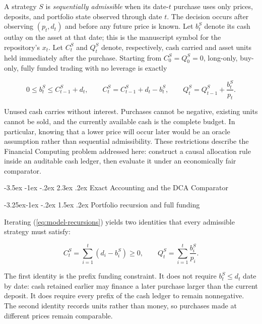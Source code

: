 \documentclass[12pt,a4paper,oneside]{report}
\makeatletter
\renewcommand\section{\@startsection{section}{1}{\z@}%
  {-3.5ex \@plus -1ex \@minus -.2ex}%
  {2.3ex \@plus .2ex}%
  {\normalfont\fontsize{14}{17}\selectfont\bfseries}}
\renewcommand\subsection{\@startsection{subsection}{2}{\z@}%
  {-3.25ex\@plus -1ex \@minus -.2ex}%
  {1.5ex \@plus .2ex}%
  {\normalfont\fontsize{12}{15}\selectfont\bfseries}}
\makeatother
\begin{document}
A strategy $S$ is \emph{sequentially admissible} when its date-$t$ purchase
uses only prices, deposits, and portfolio state observed through date $t$.
The decision occurs after observing $(p_t,d_t)$ and before any future price is
known. Let $b_t^S$ denote its cash outlay on the asset at that date; this is
the manuscript symbol for the repository's $x_t$. Let $C_t^S$ and $Q_t^S$
denote, respectively, cash carried and asset units held immediately after the
purchase. Starting from $C_0^S=Q_0^S=0$, long-only, buy-only, fully funded
trading with no leverage is exactly

\begin{equation}
  0\leq b_t^S\leq C_{t-1}^S+d_t,\qquad
  C_t^S=C_{t-1}^S+d_t-b_t^S,\qquad
  Q_t^S=Q_{t-1}^S+\frac{b_t^S}{p_t}.
  \label{eq:model-recursions}
\end{equation}

Unused cash carries without interest. Purchases cannot be negative, existing
units cannot be sold, and the currently available cash is the complete budget.
In particular, knowing that a lower price will occur later would be an oracle
assumption rather than sequential admissibility. These restrictions describe
the Financial Computing problem addressed here: construct a causal allocation
rule inside an auditable cash ledger, then evaluate it under an economically
fair comparator.

\section{Exact Accounting and the DCA Comparator}

\subsection{Portfolio recursion and full funding}
\label{sec:portfolio-recursion}

Iterating (\ref{eq:model-recursions}) yields two identities that every
admissible strategy must satisfy:

\begin{equation}
  C_t^S=\sum_{i=1}^{t}(d_i-b_i^S)\geq0,
  \qquad
  Q_t^S=\sum_{i=1}^{t}\frac{b_i^S}{p_i}.
  \label{eq:model-ledger}
\end{equation}

The first identity is the prefix funding constraint. It does not require
$b_t^S\leq d_t$ date by date: cash retained earlier may finance a later
purchase larger than the current deposit. It does require every prefix of the
cash ledger to remain nonnegative. The second identity records units rather
than money, so purchases made at different prices remain comparable.
\end{document}
